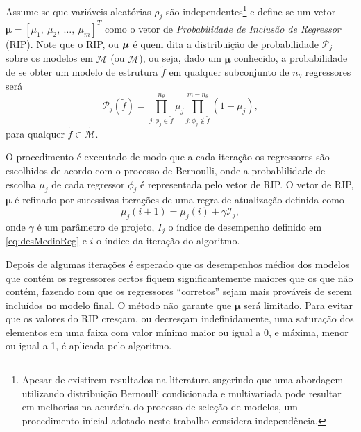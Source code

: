 Assume-se que variáveis aleatórias $\rho_j$ são independentes\footnote{Apesar de existirem resultados na literatura \citep{bianchi2016} sugerindo que uma abordagem utilizando distribuição Bernoulli condicionada e multivariada pode resultar em melhorias na acurácia do processo de seleção de modelos, um procedimento inicial adotado neste trabalho considera independência.} e define-se um vetor $\bm{\mu} = [\mu_1,\ \mu_2,\ \dots,\ \mu_m]^T$ como o vetor de \textit{Probabilidade de Inclusão de Regressor} (RIP). Note que o RIP, ou $\bm{\mu}$ é quem dita a distribuição de probabilidade  $ \mathcal{P}_j$ sobre os modelos em $\tilde{\mathscr{M}}$ (ou $\mathscr{M}$), ou seja, dado um $\bm{\mu}$ conhecido, a probabilidade de se obter um modelo de estrutura $\tilde{f}$ em qualquer subconjunto de $n_\theta$ regressores será
\begin{equation}
   \mathcal{P}_j(\tilde{f}) = \prod_{j:\phi_j \in \tilde{f}}^{n_{\theta}} \mu_j \prod_{j:\phi_j \notin \tilde{f}}^{m-n_{\theta}} (1-\mu_j),
\label{eq:distProbf_til}
\end{equation}
para qualquer $ \tilde{f} \in \tilde{\mathscr{M}}$.

O procedimento é executado de modo que a cada iteração os regressores são escolhidos de acordo com o processo de Bernoulli, onde a probablilidade de escolha $\mu_j$ de cada regressor $\phi_j$ é representada pelo vetor de RIP. O vetor de RIP, $\bm{\mu}$ é refinado por sucessivas iterações de uma regra de atualização definida como
\begin{equation}
   \mu_j(i+1) = \mu_j(i) + \gamma \mathcal{I}_j,
\label{eq:RIPupdate}
\end{equation}
onde $\gamma$ é um parâmetro de projeto, $I_j$ o índice de desempenho definido em \eqref{eq:desMedioReg} e $i$ o índice da iteração do algoritmo.


Depois de algumas iterações é esperado que os desempenhos médios dos modelos que contém os regressores certos fiquem significantemente maiores que os que não contém, fazendo com que os regressores ``corretos'' sejam mais prováveis de serem incluídos no modelo final. O método não garante que $ \bm{\mu}$ será limitado. Para evitar que os valores do RIP cresçam, ou decresçam indefinidamente, uma saturação dos elementos em uma faixa com valor mínimo maior ou igual a 0, e máxima, menor ou igual a 1, é aplicada pelo algoritmo.

